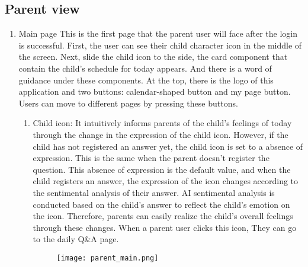 \documentclass[conference]{IEEEtran}
\begin{document}
    \subsection{Parent view}
    \begin{enumerate}
    \item Main page \hfill \break
            This is the first page that the parent user will face after the login is successful. First, the user can see their child character icon in the middle of the screen. Next, slide the child icon to the side, the card component that contain the child’s schedule for today appears. And there is a word of guidance under these components. At the top, there is the logo of this application and two buttons: calendar-shaped button and my page button. Users can move to different pages by pressing these buttons.
            \begin{enumerate}
                \item Child icon:
                It intuitively informs parents of the child's feelings of today through the change in the expression of the child icon. However, if the child has not registered an answer yet, the child icon is set to a absence of expression. This is the same when the parent doesn’t register the question. This absence of expression is the default value, and when the child registers an answer, the expression of the icon changes according to the sentimental analysis of their answer. AI sentimental analysis is conducted based on the child's answer to reflect the child's emotion on the icon. Therefore, parents can easily realize the child's overall feelings through these changes. When a parent user clicks this icon, They can go to the daily Q\&A page.
                \begin{figure}[H]
                 \centering
                 \texttt{[image: parent\_main.png]}
                 \end{figure}
                

\end{enumerate}
\end{enumerate}
\end{document}

